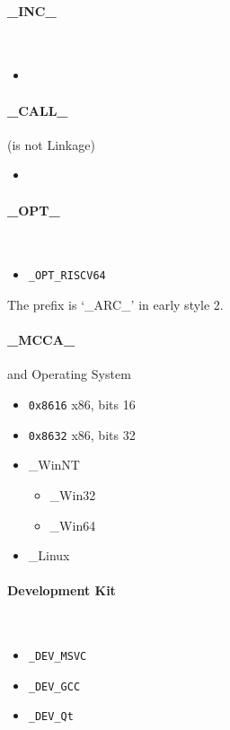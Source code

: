 \paragraph{\_INC\_} \
\begin{itemize}
	\item%
\end{itemize}

\paragraph{\_CALL\_} (is not Linkage) \
\begin{itemize}
	\item%
\end{itemize}

\paragraph{\_OPT\_} \
\begin{itemize}
	\item \verb`_OPT_RISCV64`
\end{itemize}

The prefix is `\_ARC\_' in early style 2.

\paragraph{\_MCCA\_} and Operating System

\begin{itemize}
	\item \verb|0x8616| x86, bits 16
	\item \verb|0x8632| x86, bits 32
	\item \_WinNT \begin{itemize}
		\item \_Win32
		\item \_Win64
	\end{itemize}
	\item \_Linux
\end{itemize}

\paragraph{Development Kit} \
\begin{itemize}
\item \verb `_DEV_MSVC`
\item \verb `_DEV_GCC`
\item \verb `_DEV_Qt` 
\end{itemize}
